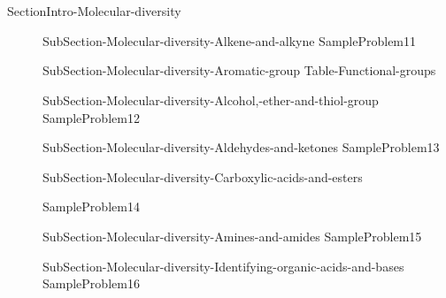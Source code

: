 \documentclass[main.tex]{subfiles}
\newcommand\chapterlabel{Ch-orgo}\setcounter{figurenewcounter}{0}\setcounter{tablenewcounter}{0}\setcounter{formulanewcounter}{0}
\begin{document}
\section{\color{blue!30!black}{Molecular diversity}}
 {SectionIntro-Molecular-diversity}\sloppy
\begin{description}
\item[]{SubSection-Molecular-diversity-Alkene-and-alkyne}
{SampleProblem11}
 \item[]{SubSection-Molecular-diversity-Aromatic-group}
 {Table-Functional-groups}
\item[]{SubSection-Molecular-diversity-Alcohol,-ether-and-thiol-group}
{SampleProblem12}
\item[] {SubSection-Molecular-diversity-Aldehydes-and-ketones}
{SampleProblem13}
\item[]{SubSection-Molecular-diversity-Carboxylic-acids-and-esters}

{SampleProblem14}

 \item[] {SubSection-Molecular-diversity-Amines-and-amides}
{SampleProblem15}
\item[]{SubSection-Molecular-diversity-Identifying-organic-acids-and-bases}
{SampleProblem16}
 \end{description}


\end{document}
